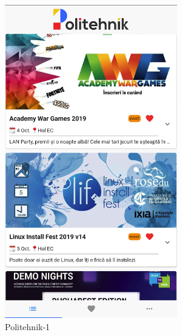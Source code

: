 \begin{figure}[!ht]
    \centering
    \begin{minipage}[b]{0.25\textwidth}
        \captionsetup{justification=centering}
        \includegraphics[width=\textwidth]{figures/app/miscellanous/politehnik-1.png}
        \caption{Politehnik-1}
        \label{4:fig:politehnik-1}
    \end{minipage}
    \hfill
    \begin{minipage}[b]{0.25\textwidth}

\end{minipage}
\end{figure}
